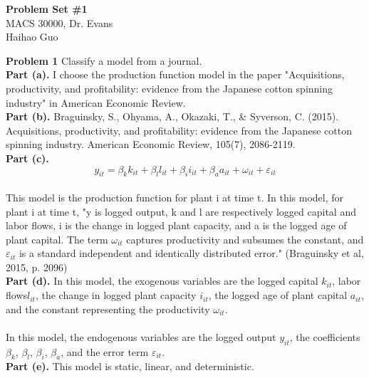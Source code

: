 \documentclass[letterpaper,12pt]{article}
\theoremstyle{definition}
\begin{document}
\begin{flushleft}
  \textbf{\large{Problem Set \#1}} \\
  MACS 30000, Dr. Evans \\
  Haihao Guo
\end{flushleft}

\vspace{5mm}

\noindent\textbf{Problem 1}
Classify a model from a journal.\\

\textbf{Part (a).} I choose the production function model in the paper "Acquisitions, productivity, and profitability: evidence from the Japanese cotton spinning industry" in American Economic Review.\\

\textbf{Part (b).} Braguinsky, S., Ohyama, A., Okazaki, T., \& Syverson, C. (2015). Acquisitions, productivity, and profitability: evidence from the Japanese cotton spinning industry. American Economic Review, 105(7), 2086-2119.\\

\textbf{Part (c).} \\
$$
y_{i t}=\beta_{k} k_{i t}+\beta_{l} l_{i t}+\beta_{i} i_{i t}+\beta_{a} a_{i t}+\omega_{i t}+\varepsilon_{i t}
$$
\\
This model is the production function for plant i at time t. In this model, for plant i at time t, "y is logged output, k and l are respectively logged capital and labor flows, i is the change in logged plant capacity, and a is the logged age of plant capital. The term $\omega_{it}$ captures productivity and subsumes the constant, and $\varepsilon_{it}$ is a standard independent and identically distributed error." (Braguinsky et al, 2015, p. 2096)
\\

\textbf{Part (d).} 
In this model, the exogenous variables are the logged capital $k_{it}$, labor flows$l_{it}$, the change in logged plant capacity $i_{it}$, the logged age of plant capital $a_{it}$, and the constant representing the productivity $\omega_{it}$.
\\
\\
In this model, the endogenous variables are the logged output $y_{it}$, the coefficients $\beta_{k}$, $\beta_{l}$, $\beta_{i}$, $\beta_{a}$, and the error term $\varepsilon_{it}$.
\\

\textbf{Part (e).} 
This model is static, linear, and deterministic.
\\
\end{document}
